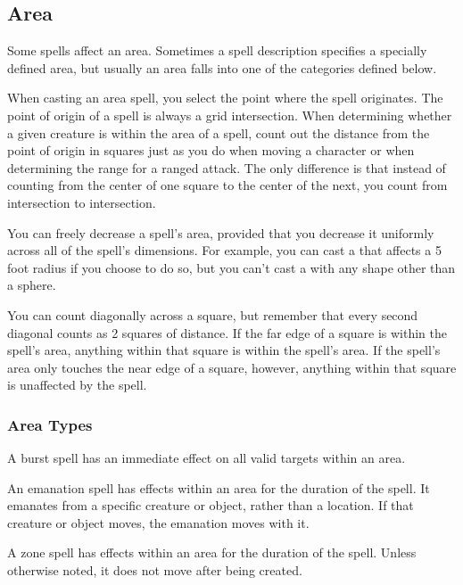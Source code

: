     \subsection{Area}\label{Spell Area}

        Some spells affect an area.
        Sometimes a spell description specifies a specially defined area, but usually an area falls into one of the categories defined below.

        When casting an area spell, you select the point where the spell originates.
        The point of origin of a spell is always a grid intersection.
        When determining whether a given creature is within the area of a spell, count out the distance from the point of origin in squares just as you do when moving a character or when determining the range for a ranged attack.
        The only difference is that instead of counting from the center of one square to the center of the next, you count from intersection to intersection.

        You can freely decrease a spell's area, provided that you decrease it uniformly across all of the spell's dimensions.
        For example, you can cast a  that affects a 5 foot radius if you choose to do so, but you can't cast a  with any shape other than a sphere.

        You can count diagonally across a square, but remember that every second diagonal counts as 2 squares of distance.
        If the far edge of a square is within the spell's area, anything within that square is within the spell's area.
        If the spell's area only touches the near edge of a square, however, anything within that square is unaffected by the spell.

        \subsubsection{Area Types}\label{Area Types}

             A burst spell has an immediate effect on all valid targets within an area.

             An emanation spell has effects within an area for the duration of the spell.
            It emanates from a specific creature or object, rather than a location.
            If that creature or object moves, the emanation moves with it.

             A zone spell has effects within an area for the duration of the spell.
            Unless otherwise noted, it does not move after being created.

